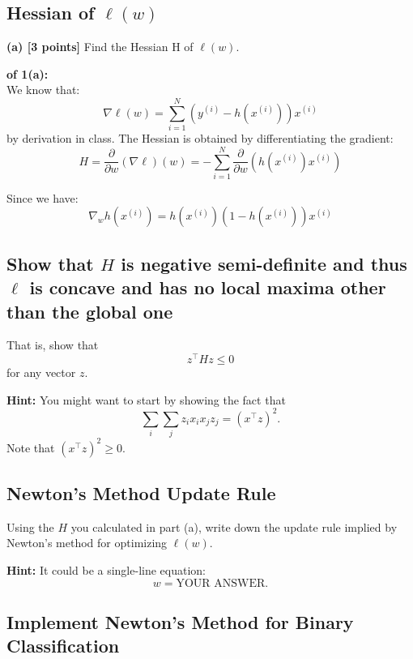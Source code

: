 \documentclass[lang=cn,11pt]{elegantbook}
\begin{document}
\subsection{Hessian of $\ell(w)$}
\textbf{(a) [3 points]} Find the Hessian H of $\ell(w)$.
\begin{solution}
    \textbf{of 1(a):}\\
 We know that: \[
\nabla \ell(w) = \sum_{i=1}^{N} (y^{(i)} - h(x^{(i)})) x^{(i)}
\] by derivation in class.
The Hessian is obtained by differentiating the gradient:
\[
H = \frac{\partial}{\partial w} (\nabla \ell)(w)  = -\sum_{i=1}^{N} \frac{\partial}{\partial w}  ( h(x^{(i)}) x^{(i)})
\]




Since we have:  \[
 \nabla_w h(x^{(i)}) =h(x^{(i)}) (1 -h(x^{(i)})) x^{(i)}
\]

\end{solution}




\subsection{Show that $H$ is negative semi-definite and thus $\ell$ is concave and has no local maxima other than the global one}

That is, show that
\begin{equation}
    z^\top H z \leq 0
\end{equation}
for any vector $z$. 

\textbf{Hint:} You might want to start by showing the fact that
\begin{equation}
    \sum_{i} \sum_{j} z_i x_i x_j z_j = (x^\top z)^2.
\end{equation}
Note that $(x^\top z)^2 \geq 0$.






\subsection{Newton's Method Update Rule}

Using the $H$ you calculated in part (a), write down the update rule implied by Newton’s method for optimizing $\ell(w)$. 

\textbf{Hint:} It could be a single-line equation:
\begin{equation}
    w = \text{YOUR ANSWER}.
\end{equation}

\subsection{Implement Newton’s Method for Binary Classification}
\end{document}
